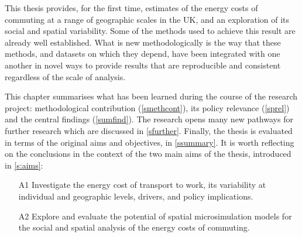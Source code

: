 This thesis provides, for the first time,
estimates of the energy costs of commuting at a range of geographic scales in
the UK, and an exploration of its social and spatial
variability. Some of the methods
used to achieve this result are already well established. What is new
methodologically is the way that these methods, and datasets on which
they depend, have been integrated with one another in novel ways
to provide results that are reproducible
and consistent regardless of the scale of analysis.

This chapter summarises what has
been learned during the course of the research project:
methodological  contribution (\cref{smethcont}), its policy relevance
(\cref{sprel}) and the central findings (\cref{sumfind}). The research opens many
new pathways for further research which are discussed in \cref{sfurther}.
Finally, the thesis is evaluated in terms of the original aims and objectives,
in \cref{ssummary}. It is worth reflecting on the conclusions in the
context of the two
main aims of the thesis, introduced in \cref{s:aims}:
\begin{itemize}
 \item[A1] Investigate the energy cost of transport to work, its variability
at individual and geographic levels, drivers, and policy implications.
  \item[A2] Explore and evaluate the potential of spatial microsimulation
models for the social and spatial analysis of the energy costs of commuting.
\end{itemize}

